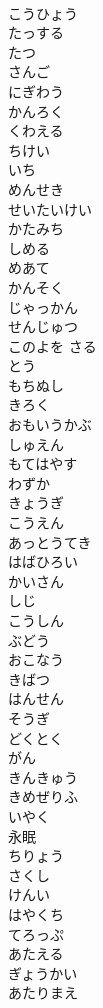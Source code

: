 \documentclass[8pt]{extreport}
\begin{document}
\begin{CJK}{UTF8}{min}
\\	こうひょう
\\	たっする
\\	たつ
\\	さんご
\\	にぎわう
\\	かんろく
\\	くわえる
\\	ちけい
\\	いち
\\	めんせき
\\	せいたいけい
\\	かたみち
\\	しめる
\\	めあて
\\	かんそく
\\	じゃっかん
\\	せんじゅつ
\\	このよを さる
\\	とう
\\	もちぬし
\\	きろく
\\	おもいうかぶ
\\	しゅえん
\\	もてはやす
\\	わずか
\\	きょうぎ
\\	こうえん
\\	あっとうてき
\\	はばひろい
\\	かいさん
\\	しじ
\\	こうしん
\\	ぶどう
\\	おこなう
\\	きばつ
\\	はんせん
\\	そうぎ
\\	どくとく
\\	がん
\\	きんきゅう
\\	きめぜりふ
\\	いやく
\\	永眠
\\	ちりょう
\\	さくし
\\	けんい
\\	はやくち
\\	てろっぷ
\\	あたえる
\\	ぎょうかい
\\	あたりまえ

\end{CJK}
\end{document}
